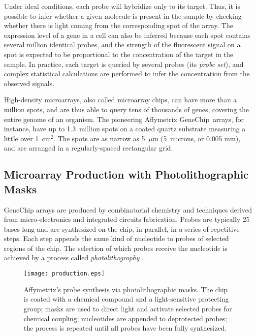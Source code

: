 Under ideal conditions, each probe will hybridize only to its target.  Thus,
it is possible to infer whether a given molecule is present in the sample by
checking whether there is light coming from the corresponding spot of the
array.  The expression level of a gene in a cell can also be inferred because
each spot contains several million identical probes, and the strength of the
fluorescent signal on a spot is expected to be proportional to the
concentration of the target in the sample. In practice, each target is queried
by several probes (its \emph{probe set}), and complex statistical calculations
are performed to infer the concentration from the observed signals.

High-density microarrays, also called microarray chips, can have more than a
million spots, and are thus able to query tens of thousands of genes, covering
the entire genome of an organism.  The pioneering Affymetrix GeneChip\textR\ 
arrays, for instance, have up to 1.3~million spots on a coated quartz
substrate measuring a little over 1~cm$^2$.  The spots are as narrow as
5~$\mu$m (5~microns, or 0.005 mm), and are arranged in a regularly-spaced
rectangular grid.

\subsection{Microarray Production with Photolithographic Masks}

GeneChip arrays are produced by combinatorial chemistry and techniques derived
from micro-electronics and integrated circuits fabrication. Probes are typically
25 bases long and are synthesized on the chip, in parallel, in a series of
repetitive steps. Each step appends the same kind of nucleotide to probes of
selected
regions of the chip. The selection of which probes receive the nucleotide is
achieved by a process called \emph{photolithography}
\citep{Fodor1991,Fodor1993}.

\begin{figure}[t]\centering
\texttt{[image: production.eps]}
\caption{Affymetrix's probe synthesis via photolithographic masks. The chip is
  coated with a chemical compound and a light-sensitive protecting group;
  masks are used to direct light and activate selected probes for chemical
  coupling; nucleotides are appended to deprotected probes; the process is
  repeated until all probes have been fully synthesized.}
\label{fig:photolithography}
\end{figure}

